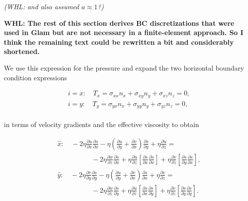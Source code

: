 \noindent
\textit{(WHL: and also assumed $a \approx 1$?)}

\textbf{WHL: The rest of this section derives BC discretizations that were used in Glam but are not necessary
in a finite-element approach. So I think the remaining text could be rewritten a bit and considerably shortened.}

We use this expression for the pressure and expand the two horizontal boundary condition expressions

\begin{equation}
\begin{split}
 & i=x:\quad T_{x}=\sigma _{xx}n_{x}+\sigma _{xy}n_{y}+\sigma _{xz}n_{z}=0, \\ 
 & i=y:\quad T_{y}=\sigma _{yx}n_{x}+\sigma _{yy}n_{y}+\sigma _{yz}n_{z}=0, \\
\end{split}
 \end{equation}

in terms of velocity gradients and the effective viscosity to obtain

\begin{equation}
\begin{split}
   {} & \hat{x}:\quad -2\eta \frac{\partial u}{\partial x}\frac{\partial s}{\partial x}-\eta \left( \frac{\partial u}{\partial y}+\frac{\partial v}{\partial x} \right)\frac{\partial s}{\partial y}+\eta \frac{\partial u}{\partial z}=  \\
   {} & \quad \quad \quad \quad \quad -2\eta \frac{\partial w}{\partial z}\frac{\partial s}{\partial x}+\eta \frac{\partial u}{\partial z}\left[ \frac{\partial s}{\partial x}\frac{\partial s}{\partial x} \right]+\eta \frac{\partial v}{\partial z}\left[ \frac{\partial s}{\partial y}\frac{\partial s}{\partial x} \right],  \\
%
   {} & \hat{y}:\quad -2\eta \frac{\partial v}{\partial y}\frac{\partial s}{\partial y}-\eta \left( \frac{\partial u}{\partial y}+\frac{\partial v}{\partial x} \right)\frac{\partial s}{\partial x}+\eta \frac{\partial v}{\partial z}=  \\
   {} & \quad \quad \quad \quad \quad -2\eta \frac{\partial w}{\partial z}\frac{\partial s}{\partial y}+\eta \frac{\partial u}{\partial z}\left[ \frac{\partial s}{\partial x}\frac{\partial s}{\partial y} \right]+\eta \frac{\partial v}{\partial z}\left[ \frac{\partial s}{\partial y}\frac{\partial s}{\partial y} \right].  \\
\end{split}
\end{equation}

